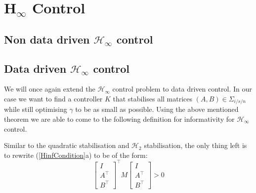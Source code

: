 \section{H$_\infty$ Control}


\subsection{Non data driven $\mathcal{H}_\infty$ control}





\subsection{Data driven $\mathcal{H}_\infty$ control}

We will once again extend the $\mathcal{H}_\infty$ control problem to data driven control. In our case we want to find a controller $K$ that stabilises all matrices $(A,B) \in \Sigma_{i/s/n}$ while still optimising $\gamma$ to be as small as possible. Using the above mentioned theorem we are able to come to the following definition for informativity for $\mathcal{H}_\infty$ control.


Similar to the quadratic stabilisation and $\mathcal{H}_2$ stabilisation, the only thing left is to rewrite (\ref{HinfCondition}a) to be of the form:
\begin{equation*}
	\begin{bmatrix} I \\ A^\top \\ B^\top \end{bmatrix}^\top
	M
	\begin{bmatrix} I \\ A^\top \\ B^\top \end{bmatrix} > 0
\end{equation*}

